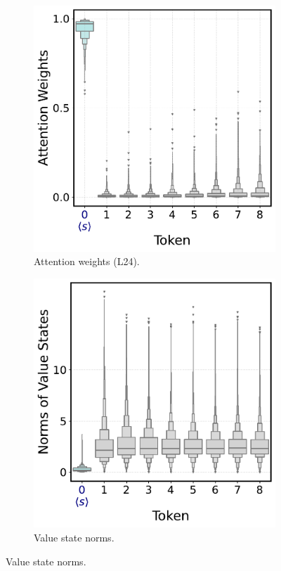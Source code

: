 \begin{figure}[h]
    \centering
    \begin{subfigure}{0.31\textwidth}
        \centering 
        \caption{Attention weights (L24).}
        \includegraphics[width=\textwidth]{Figures/more_samples_statics/attn_weights_k_tokens.pdf}
    \end{subfigure}
    \hfill
    \begin{subfigure}{0.31\textwidth}
    \centering 
    \caption{Value state norms.}
    \includegraphics[width=\textwidth]{Figures/more_samples_statics/val_drain_batch.pdf}

\end{subfigure}
\end{figure}
